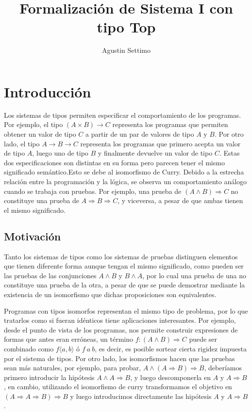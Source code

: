\documentclass[]{report}
\title{Formalización de Sistema I con tipo Top}
\author{Agustin Settimo}
\begin{document}
	
	\maketitle
	\tableofcontents
	
	\begin{abstract}
		
	\end{abstract}
	
	\chapter{Introducción}
	Los sistemas de tipos permiten especificar el comportamiento de los programas.
	Por ejemplo, el tipo $(A \times B) \rightarrow C$ representa los programas que permiten obtener un valor de tipo $C$ a partir de un par de valores de tipo $A$ y $B$. Por otro lado, el tipo $A \rightarrow B \rightarrow C$ representa los programas que primero acepta un valor de tipo $A$, luego uno de tipo $B$ y finalmente devuelve un valor de tipo $C$.
	Estas dos especificaciones son distintas en su forma pero parecen tener el mismo significado semántico.Esto se debe
	al isomorfismo de Curry.
	Debido a la estrecha relación entre la programación y la lógica, se observa un comportamiento análogo cuando se trabaja con pruebas.
	Por ejemplo, una prueba de $(A \wedge B) \Rightarrow C$ no constituye una prueba de $A \Rightarrow B \Rightarrow C$, y viceversa, a pesar de que ambas tienen el mismo significado. 
	
	\section{Motivación}
	
	Tanto los sistemas de tipos como los sistemas de pruebas distinguen elementos que tienen diferente forma aunque tengan el mismo significado, como pueden ser las pruebas de las conjunciones $A \wedge B$ y $B \wedge A$, por lo cual una prueba de una no constituye una prueba de la otra, a pesar de que se puede demostrar mediante la existencia de un isomorfismo que dichas proposiciones son equivalentes.
	
	Programas con tipos isomorfos representan el mismo tipo de problema, por lo que tratarlos como si fueran idénticos tiene aplicaciones interesantes.
	Por ejemplo, desde el punto de vista de los programas, nos permite construir expresiones de formas que antes eran erróneas, un término $f : (A \wedge B) \Rightarrow C$ puede ser combinado como $f \langle a, b \rangle$ ó $f \: a \: b$, es decir, es posible sortear cierta rigidez impuesta por el sistema de tipos.
	Por otro lado, los isomorfismos hacen que las pruebas sean más naturales, por ejemplo, para probar, $A \wedge (A \Rightarrow  B) \Rightarrow B$, deberíamos primero introducir la hipótesis $A \wedge A \Rightarrow  B$, y luego descomponerla en $A$ y $A \Rightarrow B$, en cambio, utilizando el isomorfismo de curry transformamos el objetivo en $(A \Rightarrow A \Rightarrow  B) \Rightarrow B$ y luego introducimos directamente las hipótesis $A$ y $A \Rightarrow B$.
	
\end{document}
